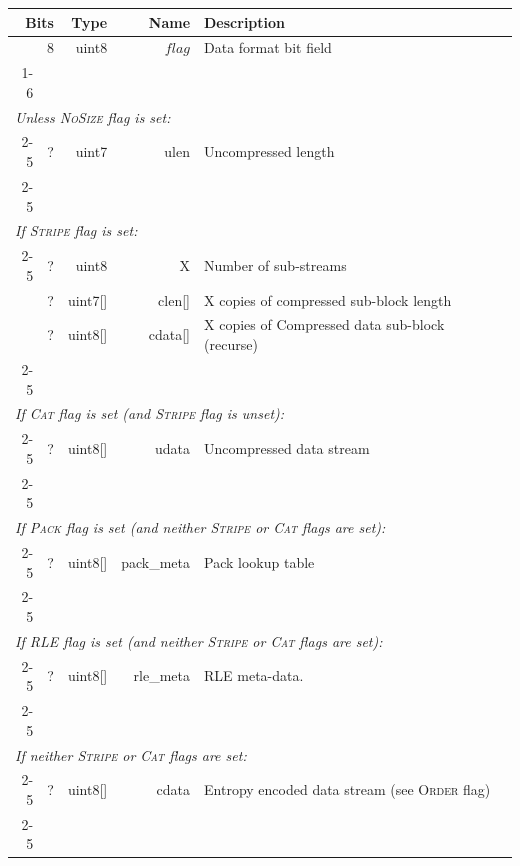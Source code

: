 \documentclass[a4paper]{article}
\begin{document}
\begin{table}[h]
\centering
\begin{tabular}{|r|r|r|r|p{9cm}|l|}
\hline
\multicolumn{2}{|r|}{\textbf{Bits} } & \textbf{Type}  & \textbf{Name} & \multicolumn{2}{p{9cm}|}{\textbf{Description}} \\
\hline
\multicolumn{2}{|r|}{8} & uint8 & $flag$ & \multicolumn{2}{p{9cm}|}{Data format bit field}\\
\cline{1-6}

\multicolumn{6}{|l|}{}\\[-0.3em]
\multicolumn{6}{|l|}{\textit{Unless \textsc{NoSize} flag is set:} } \\
\cline{2-5}
& ? & uint7 & ulen & Uncompressed length & \\
\cline{2-5}

\multicolumn{6}{|l|}{}\\[-0.3em]
\multicolumn{6}{|l|}{\textit{If \textsc{Stripe} flag is set:} } \\
\cline{2-5}
& ? & uint8 & X & Number of sub-streams & \\
& ? & uint7[] & clen[] & X copies of compressed sub-block length & \\
& ? & uint8[] & cdata[] & X copies of Compressed data sub-block (recurse) & \\
\cline{2-5}

\multicolumn{6}{|l|}{}\\[-0.7em]
\multicolumn{6}{|l|}{\textit{If \textsc{Cat} flag is set (and \textsc{Stripe} flag is unset):} } \\
\cline{2-5}
& ? & uint8[] & udata & Uncompressed data stream & \\
\cline{2-5}

\multicolumn{6}{|l|}{}\\[-0.7em]
\multicolumn{6}{|l|}{\textit{If \textsc{Pack} flag is set (and neither \textsc{Stripe} or \textsc{Cat} flags are set):} } \\
\cline{2-5}
& ? & uint8[] & pack\_meta & Pack lookup table & \\
\cline{2-5}

\multicolumn{6}{|l|}{}\\[-0.7em]
\multicolumn{6}{|l|}{\textit{If \textsc{RLE} flag is set (and neither \textsc{Stripe} or \textsc{Cat} flags are set):} } \\
\cline{2-5}
& ? & uint8[] & rle\_meta & RLE meta-data.\\
\cline{2-5}

\multicolumn{6}{|l|}{}\\[-0.7em]
\multicolumn{6}{|l|}{\textit{If neither \textsc{Stripe} or \textsc{Cat} flags are set:} } \\
\cline{2-5}
& ? & uint8[] & cdata & Entropy encoded data stream (see \textsc{Order} flag) & \\
\cline{2-5}
\multicolumn{6}{|l|}{}\\
\hline
\end{tabular}
\end{table}
\end{document}
